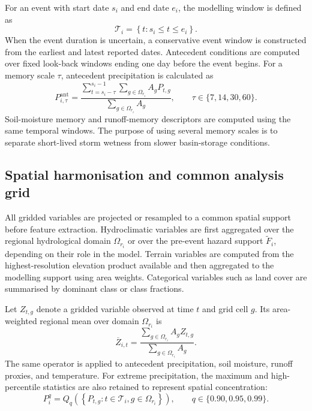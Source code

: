 \documentclass[pdflatex,sn-mathphys-ay]{sn-jnl}
\theoremstyle{thmstyleone}
\begin{document}
\begin{appendices}
For an event with start date $s_i$ and end date $e_i$, the modelling
window is defined as
\begin{equation}
  \mathcal{T}_{i}
  =
  \left\{
    t:s_i\leq t\leq e_i
  \right\}.
  \label{eq:app_event_window}
\end{equation}
When the event duration is uncertain, a conservative event window is
constructed from the earliest and latest reported dates.  Antecedent
conditions are computed over fixed look-back windows ending one day
before the event begins.  For a memory scale $\tau$, antecedent
precipitation is calculated as
\begin{equation}
  P^{\mathrm{ant}}_{i,\tau}
  =
  \frac{
    \displaystyle
    \sum_{t=s_i-\tau}^{s_i-1}
    \sum_{g\in\Omega_{r_i}} A_g P_{t,g}
  }{
    \displaystyle
    \sum_{g\in\Omega_{r_i}} A_g
  },
  \qquad
  \tau\in\{7,14,30,60\}.
  \label{eq:app_antecedent_precip}
\end{equation}
Soil-moisture memory and runoff-memory descriptors are computed using
the same temporal windows.  The purpose of using several memory scales
is to separate short-lived storm wetness from slower basin-storage
conditions.

\subsection{Spatial harmonisation and common analysis grid}
\label{app:spatial_harmonisation}

All gridded variables are projected or resampled to a common spatial
support before feature extraction.  Hydroclimatic variables are first
aggregated over the regional hydrological domain
$\Omega_{r_i}$ or over the pre-event hazard support
$\widetilde{F}_i$, depending on their role in the model.  Terrain
variables are computed from the highest-resolution elevation product
available and then aggregated to the modelling support using area
weights.  Categorical variables such as land cover are summarised by
dominant class or class fractions.

Let $Z_{t,g}$ denote a gridded variable observed at time $t$ and grid
cell $g$.  Its area-weighted regional mean over domain
$\Omega_{r_i}$ is
\begin{equation}
  \overline{Z}_{i,t}
  =
  \frac{
    \displaystyle
    \sum_{g\in\Omega_{r_i}} A_g Z_{t,g}
  }{
    \displaystyle
    \sum_{g\in\Omega_{r_i}} A_g
  }.
  \label{eq:app_area_mean}
\end{equation}
The same operator is applied to antecedent precipitation, soil
moisture, runoff proxies, and temperature.  For extreme precipitation,
the maximum and high-percentile statistics are also retained to
represent spatial concentration:
\begin{equation}
  P^{q}_{i}
  =
  Q_q
  \left(
    \left\{
      P_{t,g}:t\in\mathcal{T}_{i},
      g\in\Omega_{r_i}
    \right\}
  \right),
  \qquad
  q\in\{0.90,0.95,0.99\}.
  \label{eq:app_precip_quantile}
\end{equation}


\end{appendices}
\end{document}
